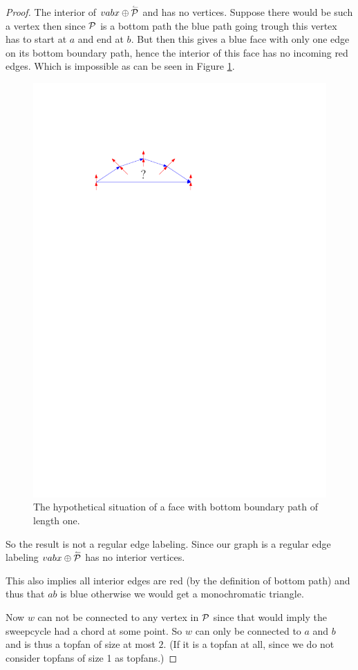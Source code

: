 \begin{proof}
    The interior of  $vabx \oplus \rev \P$ and has no vertices. Suppose there would be such a vertex then since $\P$ is a bottom path the blue path going trough this vertex has to start at $a$ and end at $b$. But then this gives a blue face with only one edge on its bottom boundary path, hence the interior of this face has no incoming red edges.
    Which is impossible as can be seen in Figure \ref{fig:sweep:noFaceWithOneBottomEdge}.

    \begin{figure}[h]
      \centering
      \includegraphics[scale=1]{unifiedAlgo/img/sweep/noFaceWithOneBottomEdge.pdf}
      \caption{The hypothetical situation of a face with bottom boundary path of length one.}
      \label{fig:sweep:noFaceWithOneBottomEdge}
    \end{figure}

    So the result is not a regular edge labeling. Since our graph is a regular edge labeling $vabx \oplus \rev \P$ has no interior vertices.

    This also implies all interior edges are red (by the definition of bottom path) and thus that $ab$ is blue otherwise we would get a monochromatic triangle.

    Now $w$ can not be connected to any vertex in $\P$ since that would imply the sweepcycle had a chord at some point.
    So $w$ can only be connected to $a$ and $b$ and is thus a topfan of size at most $2$.
    (If it is a topfan at all, since we do not consider topfans of size 1 as topfans.)
  \end{proof}
